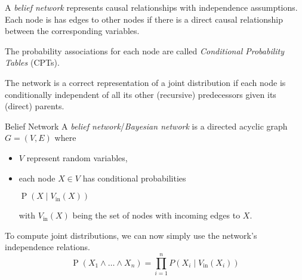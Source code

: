 \documentclass[english]{panikzettel}
\begin{document}
\begin{halfboxl}
A \emph{belief network} represents causal relationships with independence assumptions.
Each node is has edges to other nodes if there is a direct causal relationship between the corresponding variables.

The probability associations for each node are called \emph{Conditional Probability Tables} (CPTs).

The network is a correct representation of a joint distribution if each node is conditionally independent of all its other (recursive) predecessors given its (direct) parents.
\end{halfboxl}%
\begin{halfboxr}
\vspace{-\baselineskip}
\begin{defi}{Belief Network}
A \emph{belief network}/\emph{Bayesian network} is a directed acyclic graph $G = (V,E)$ where
\begin{itemize}
    \item $V$ represent random variables,
    \item each node $X \in V$ has conditional probabilities
        \begin{tightcenter}
        $\operatorname{P}(X \mid V_\mathrm{in}(X))$
        \end{tightcenter}
        with $V_\mathrm{in}(X)$ being the set of nodes with incoming edges to $X$.
\end{itemize}
\end{defi}
\end{halfboxr}

To compute joint distributions, we can now simply use the network's independence relations.
\[ \operatorname{P}(X_1 \land \ldots \land X_n) = \prod_{i=1}^n P(X_i \mid V_\mathrm{in}(X_i)) \]
\end{document}
